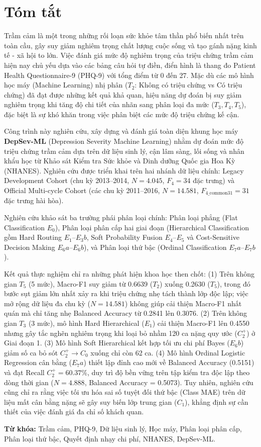 \chapter*{Tóm tắt}

Trầm cảm là một trong những rối loạn sức khỏe tâm thần phổ biến nhất trên toàn cầu, gây suy giảm nghiêm trọng chất lượng cuộc sống và tạo gánh nặng kinh tế - xã hội to lớn. Việc đánh giá mức độ nghiêm trọng của triệu chứng trầm cảm hiện nay chủ yếu dựa vào các bảng câu hỏi tự điền, điển hình là thang đo Patient Health Questionnaire-9 (PHQ-9) với tổng điểm từ 0 đến 27. Mặc dù các mô hình học máy (Machine Learning) nhị phân ($T_2$: Không có triệu chứng vs Có triệu chứng) đã đạt được những kết quả khả quan, hiệu năng dự đoán bị suy giảm nghiêm trọng khi tăng độ chi tiết của nhãn sang phân loại đa mức ($T_3, T_4, T_5$), đặc biệt là sự khó khăn trong việc phân biệt các mức độ triệu chứng kế cận.

Công trình này nghiên cứu, xây dựng và đánh giá toàn diện khung học máy \textbf{DepSev-ML} (Depression Severity Machine Learning) nhằm dự đoán mức độ triệu chứng trầm cảm dựa trên dữ liệu sinh lý, cận lâm sàng, lối sống và nhân khẩu học từ Khảo sát Kiểm tra Sức khỏe và Dinh dưỡng Quốc gia Hoa Kỳ (NHANES). Nghiên cứu được triển khai trên hai nhánh dữ liệu chính: Legacy Development Cohort (chu kỳ 2013--2014, $N = 4.045$, $F_4 = 34$ đặc trưng) và Official Multi-cycle Cohort (các chu kỳ 2011--2016, $N = 14.581$, $F_{4\_\text{common31}} = 31$ đặc trưng hài hòa).

Nghiên cứu khảo sát ba trường phái phân loại chính: Phân loại phẳng (Flat Classification $E_0$), Phân loại phân cấp hai giai đoạn (Hierarchical Classification gồm Hard Routing $E_1$--$E_3b$, Soft Probability Fusion $E_4$--$E_5$ và Cost-Sensitive Decision Making $E_6a$--$E_6b$), và Phân loại thứ bậc (Ordinal Classification $E_7a$--$E_7b$). 

Kết quả thực nghiệm chỉ ra những phát hiện khoa học then chốt: (1) Trên không gian $T_5$ (5 mức), Macro-F1 suy giảm từ 0.6639 ($T_2$) xuống 0.2630 ($T_5$), trong đó bước sụt giảm lớn nhất xảy ra khi triệu chứng nhẹ tách thành lớp độc lập; việc mở rộng dữ liệu đa chu kỳ ($N = 14.581$) không giúp cải thiện Macro-F1 nhất quán mà chỉ tăng nhẹ Balanced Accuracy từ 0.2841 lên 0.3076. (2) Trên không gian $T_3$ (3 mức), mô hình Hard Hierarchical ($E_1$) cải thiện Macro-F1 lên 0.4550 nhưng gây tắc nghẽn nghiêm trọng khi loại bỏ nhầm 120 ca nặng quy ước ($C_2^+$) ở Giai đoạn 1. (3) Mô hình Soft Hierarchical kết hợp tối ưu chi phí Bayes ($E_6b$) giảm số ca bỏ sót $C_2^+ \to C_0$ xuống chỉ còn 62 ca. (4) Mô hình Ordinal Logistic Regression cân bằng ($E_7a$) thiết lập đỉnh cao mới về Balanced Accuracy (0.5151) và đạt Recall $C_2^+ = 60.37\%$, duy trì độ bền vững trên tập kiểm tra độc lập theo dòng thời gian ($N = 4.888$, Balanced Accuracy = 0.5073). Tuy nhiên, nghiên cứu cũng chỉ ra rằng việc tối ưu hóa sai số tuyệt đối thứ bậc (Class MAE) trên dữ liệu mất cân bằng nặng sẽ gây suy biến lớp trung gian ($C_1$), khẳng định sự cần thiết của việc đánh giá đa chỉ số khách quan.

\vspace{0.8cm}
\noindent \textbf{Từ khóa:} Trầm cảm, PHQ-9, Dữ liệu sinh lý, Học máy, Phân loại phân cấp, Phân loại thứ bậc, Quyết định nhạy chi phí, NHANES, DepSev-ML.
\cleardoublepage
